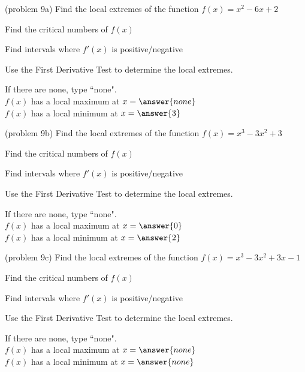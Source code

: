 \documentclass[handout]{ximera}
\begin{document}
\begin{problem}(problem 9a)
Find the local extremes of the function $f(x) = x^2 - 6x + 2$\\
\begin{hint}
Find the critical numbers of $f(x)$
\end{hint}
\begin{hint}
Find intervals where $f'(x)$ is positive/negative
\end{hint}

\begin{hint}
Use the First Derivative Test to determine the local extremes.
\end{hint}

If there are none, type ``none".\\
$f(x)$ has a local maximum at $x = \answer{none}$\\
$f(x)$ has a local minimum at $x = \answer{3}$
\end{problem}


\begin{problem}(problem 9b)
Find the local extremes of the function $f(x) = x^3 - 3x^2 + 3$\\
\begin{hint}
Find the critical numbers of $f(x)$
\end{hint}
\begin{hint}
Find intervals where $f'(x)$ is positive/negative
\end{hint}
\begin{hint}
Use the First Derivative Test to determine the local extremes.
\end{hint}

If there are none, type ``none".\\
$f(x)$ has a local maximum at $x = \answer{0}$\\
$f(x)$ has a local minimum at $x = \answer{2}$
\end{problem}


\begin{problem}(problem 9c)
Find the local extremes of the function $f(x) = x^3 - 3x^2 +3x -1$\\
\begin{hint}
Find the critical numbers of $f(x)$
\end{hint}
\begin{hint}
Find intervals where $f'(x)$ is positive/negative
\end{hint}
\begin{hint}
Use the First Derivative Test to determine the local extremes.
\end{hint}

If there are none, type ``none".\\
$f(x)$ has a local maximum at $x = \answer{none}$\\
$f(x)$ has a local minimum at $x = \answer{none}$
\end{problem}
\end{document}
